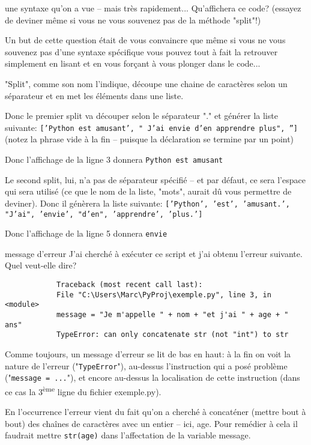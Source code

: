 \documentclass[12pt]{article}
\begin{document}
	\begin{MonQz}{une syntaxe qu'on a vue -- mais très rapidement...}
		Qu'affichera ce code? (essayez de deviner même si vous ne vous souvenez pas de la méthode "split"!)
	\end{MonQz}
	\begin{MaReponse}
		Un but de cette question était de vous convaincre que même si vous ne vous souvenez pas d'une syntaxe spécifique vous pouvez tout à fait la retrouver simplement en lisant et en vous forçant à vous plonger dans le code...
		
		"Split", comme son nom l'indique, découpe une chaine de caractères selon un séparateur et en met les éléments dans une liste.
		
		Donc le premier split va découper selon le séparateur "." et générer la liste suivante:
		\texttt{['Python est amusant', " J'ai envie d'en apprendre plus", '']}
		(notez la phrase vide à la fin -- puisque la déclaration se termine par un point)
		
		Donc l'affichage de la ligne 3 donnera \texttt{Python est amusant}
		
		Le second split, lui, n'a pas de séparateur spécifié -- et par défaut, ce sera l'espace qui sera utilisé (ce que le nom de la liste, "mots", aurait dû vous permettre de deviner). Donc il génèrera la liste suivante:
		\texttt{['Python', 'est', 'amusant.', "J'ai", 'envie', "d'en", 'apprendre', 'plus.']}
		
		Donc l'affichage de la ligne 5 donnera \texttt{envie}
	\end{MaReponse}

	\begin{MonQz}{message d'erreur}
		J'ai cherché à exécuter ce script et j'ai obtenu l'erreur suivante. Quel veut-elle dire?
		\begin{verbatim}
			Traceback (most recent call last):
			File "C:\Users\Marc\PyProj\exemple.py", line 3, in <module>
			message = "Je m'appelle " + nom + "et j'ai " + age + " ans"
			TypeError: can only concatenate str (not "int") to str
		\end{verbatim}
	\end{MonQz}
	\begin{MaReponse}
		Comme toujours, un message d'erreur se lit de bas en haut: à la fin on voit la nature de l'erreur ("\texttt{TypeError}"), au-dessus l'instruction qui a posé problème ("\texttt{message = ...}"), et encore au-dessus la localisation de cette instruction (dans ce cas la 3\textsuperscript{ème} ligne du fichier exemple.py).
		
		En l'occurrence l'erreur vient du fait qu'on a cherché à concaténer (mettre bout à bout) des chaînes de caractères avec un entier -- ici, age. Pour remédier à cela il faudrait mettre \texttt{str(age)} dans l'affectation de la variable message.
	\end{MaReponse}
\end{document}
